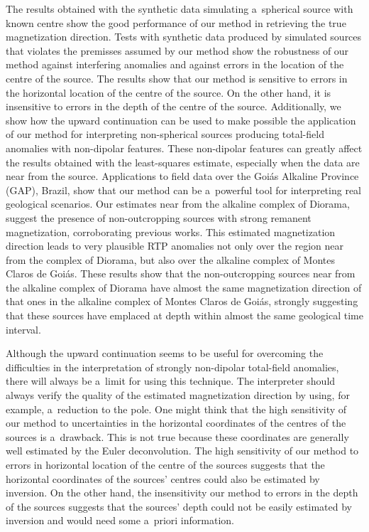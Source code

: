\documentclass[journal abbreviation, npg]{copernicus}
\begin{document}
The results obtained with the synthetic data simulating a~spherical source
with known centre show the good performance of our method in retrieving the
true magnetization direction. Tests with synthetic data produced by simulated
sources that violates the premisses assumed by our method show the robustness
of our method against interfering anomalies and against errors in the
location of the centre of the source. The results show that our method is
sensitive to errors in the horizontal location of the centre of the source.
On the other hand, it is insensitive to errors in the depth of the centre of
the source. Additionally, we show how the upward continuation can be used to
make possible the application of our method for interpreting non-spherical
sources producing total-field anomalies with non-dipolar features. These
non-dipolar features can greatly affect the results obtained with the
least-squares estimate, especially when the data are near from the source.
Applications to field data over the Goi\'{a}s Alkaline Province (GAP),
Brazil, show that our method can be a~powerful tool for interpreting real
geological scenarios. Our estimates near from the alkaline complex of
Diorama, suggest the presence of non-outcropping sources with strong remanent
magnetization, corroborating previous works. This estimated magnetization
direction leads to very plausible RTP anomalies not only over the region near
from the complex of Diorama, but also over the alkaline complex of Montes
Claros de Goi\'{a}s. These results show that the non-outcropping sources near
from the alkaline complex of Diorama have almost the same magnetization
direction of that ones in the alkaline complex of Montes Claros de Goi\'{a}s,
strongly suggesting that these sources have emplaced at depth within almost
the same geological time interval.

Although the upward continuation seems to be useful for overcoming the
difficulties in the interpretation of strongly non-dipolar total-field
anomalies, there will always be a~limit for using this technique. The
interpreter should always verify the quality of the estimated magnetization
direction by using, for example, a~reduction to the pole. One might think
that the high sensitivity of our method to uncertainties in the horizontal
coordinates of the centres of the sources is a~drawback. This is not true
because these coordinates are generally well estimated by the Euler
deconvolution. The high sensitivity of our method to errors in horizontal
location of the centre of the sources suggests that the horizontal
coordinates of the sources' centres could also be estimated by inversion. On
the other hand, the insensitivity our method to errors in the depth of the
sources suggests that the sources' depth could not be easily estimated by
inversion and would need some a~priori information.
\end{document}
